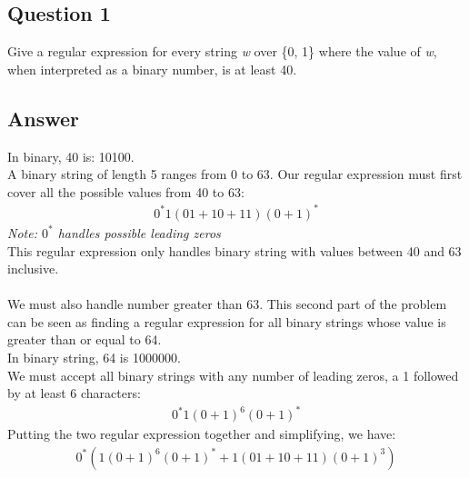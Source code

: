 \newpage
\subsection*{Question 1}
\noindent [5 pts] Give a regular expression for every string \emph{w} over \{0, 1\} where the value of \emph{w}, when interpreted as a binary number, is at least 40.

\subsection*{Answer}

\noindent In binary, 40 is: 10100.\\
\noindent A binary string of length 5 ranges from 0 to 63. Our regular expression must first cover all the possible values from 40 to 63:
\begin{align*}
    0^*1(01 + 10 + 11)(0 + 1)^*
\end{align*}
\emph{Note: $0^*$ handles possible leading zeros}\\
\noindent This regular expression only handles binary string with values between 40 and 63 inclusive.\\\\
\noindent We must also handle number greater than 63. This second part of the problem can be seen as finding 
a regular expression for all binary strings whose value is greater than or equal to 64.\\
In binary string, 64 is 1000000.\\
\noindent We must accept all binary strings with any number of leading zeros, a 1 followed by at least 6 characters:
\begin{align*}
    0^*1(0 + 1)^6(0 + 1)^*
\end{align*}
\noindent Putting the two regular expression together and simplifying, we have:
\begin{align*}
    0^*(1(0 + 1)^6(0 + 1)^* + 1(01 + 10 + 11)(0 + 1)^3)
\end{align*}

